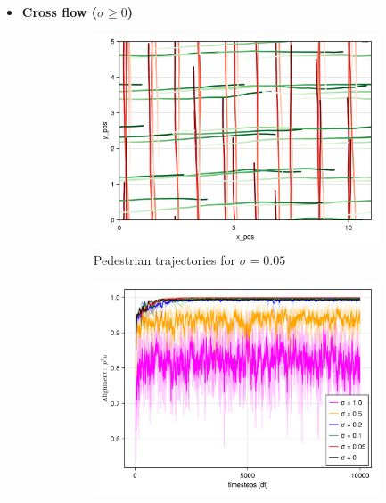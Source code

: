 \begin{itemize}
    \item \textbf{Cross flow ($\sigma \geq 0$)}
    \begin{figure}[H]
        \centering
        \begin{subfigure}{.49\textwidth}
            \centering
            \includegraphics[width=\linewidth]{figures/ch5_collective_stoch/traj_stochastic_cross_10000.png}
            \caption{Pedestrian trajectories for $\sigma = 0.05$}
            \label{plot:stoc_cross_traj}
        \end{subfigure}
        \begin{subfigure}{.49\textwidth}
            \centering
            \includegraphics[width=\linewidth]{figures/ch5_collective_stoch/align_stochastic_cross.png}

\end{subfigure}
\end{figure}
\end{itemize}
